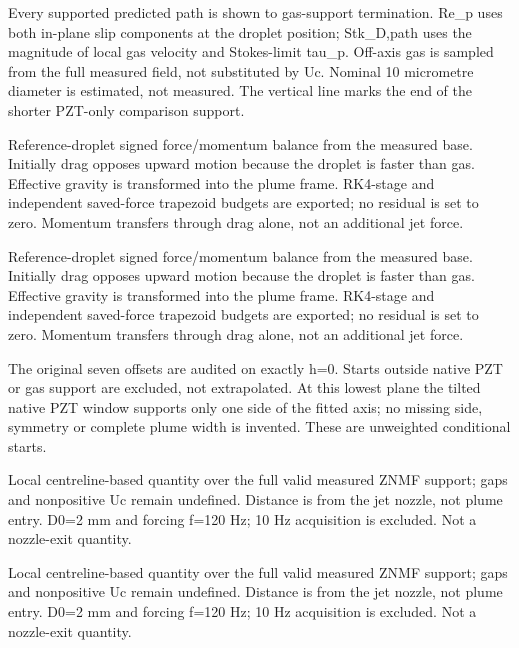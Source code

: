 \caption{Every supported predicted path is shown to gas-support termination. Re\_p uses both in-plane slip components at the droplet position; Stk\_D,path uses the magnitude of local gas velocity and Stokes-limit tau\_p. Off-axis gas is sampled from the full measured field, not substituted by Uc. Nominal 10 micrometre diameter is estimated, not measured. The vertical line marks the end of the shorter PZT-only comparison support.}

\caption{Reference-droplet signed force/momentum balance from the measured base. Initially drag opposes upward motion because the droplet is faster than gas. Effective gravity is transformed into the plume frame. RK4-stage and independent saved-force trapezoid budgets are exported; no residual is set to zero. Momentum transfers through drag alone, not an additional jet force.}

\caption{Reference-droplet signed force/momentum balance from the measured base. Initially drag opposes upward motion because the droplet is faster than gas. Effective gravity is transformed into the plume frame. RK4-stage and independent saved-force trapezoid budgets are exported; no residual is set to zero. Momentum transfers through drag alone, not an additional jet force.}

\caption{The original seven offsets are audited on exactly h=0. Starts outside native PZT or gas support are excluded, not extrapolated. At this lowest plane the tilted native PZT window supports only one side of the fitted axis; no missing side, symmetry or complete plume width is invented. These are unweighted conditional starts.}

\caption{Local centreline-based quantity over the full valid measured ZNMF support; gaps and nonpositive Uc remain undefined. Distance is from the jet nozzle, not plume entry. D0=2 mm and forcing f=120 Hz; 10 Hz acquisition is excluded. Not a nozzle-exit quantity.}

\caption{Local centreline-based quantity over the full valid measured ZNMF support; gaps and nonpositive Uc remain undefined. Distance is from the jet nozzle, not plume entry. D0=2 mm and forcing f=120 Hz; 10 Hz acquisition is excluded. Not a nozzle-exit quantity.}
